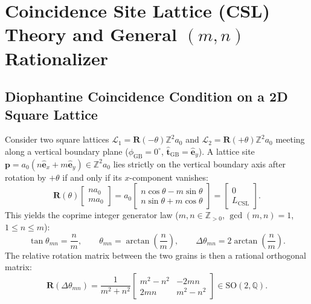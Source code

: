 \documentclass[11pt,a4paper]{article}
\newcommand{\Z}{\mathbb{Z}}
\newcommand{\Q}{\mathbb{Q}}
\begin{document}
\section{Coincidence Site Lattice (CSL) Theory and General $(m,n)$ Rationalizer}

\subsection{Diophantine Coincidence Condition on a 2D Square Lattice}
Consider two square lattices $\mathcal{L}_1 = \mathbf{R}(-\theta)\Z^2 a_0$ and $\mathcal{L}_2 = \mathbf{R}(+\theta)\Z^2 a_0$ meeting along a vertical boundary plane ($\phi_{\text{GB}} = 0^\circ$, $\hat{\mathbf{t}}_{\text{GB}} = \hat{\mathbf{e}}_y$). A lattice site $\mathbf{p} = a_0(n\hat{\mathbf{e}}_x + m\hat{\mathbf{e}}_y) \in \Z^2 a_0$ lies strictly on the vertical boundary axis after rotation by $+\theta$ if and only if its $x$-component vanishes:
\begin{equation}
  \mathbf{R}(\theta)\begin{bmatrix} n a_0 \\ m a_0 \end{bmatrix}
  = a_0 \begin{bmatrix} n\cos\theta - m\sin\theta \\ n\sin\theta + m\cos\theta \end{bmatrix}
  = \begin{bmatrix} 0 \\ L_{\text{CSL}} \end{bmatrix}.
\end{equation}
This yields the coprime integer generator law ($m, n \in \Z_{>0}$, $\gcd(m,n) = 1$, $1 \le n \le m$):
\begin{equation}
  \tan\theta_{mn} = \frac{n}{m}, \qquad
  \theta_{mn} = \arctan\!\left(\frac{n}{m}\right), \qquad
  \Delta\theta_{mn} = 2\arctan\!\left(\frac{n}{m}\right).
\end{equation}
The relative rotation matrix between the two grains is then a rational orthogonal matrix:
\begin{equation}
  \mathbf{R}(\Delta\theta_{mn}) = \frac{1}{m^2 + n^2}
  \begin{bmatrix}
    m^2 - n^2 & -2mn \\
    2mn & m^2 - n^2
  \end{bmatrix} \in \mathrm{SO}(2,\Q).
\end{equation}
\end{document}
